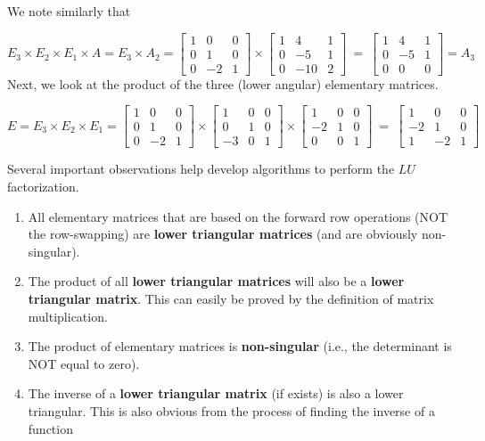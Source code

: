 \documentclass[
]{book}
\begin{document}
We note similarly that

\[
E_3\times E_2\times E_1\times A = E_3\times A_2 =\left[\begin{array}{cccc} 
1 & 0 & 0   \\ 
0 & 1 & 0  \\ 
0 & -2 & 1  
\end{array}
\right]
\times
\left[\begin{array}{cccc} 
1 & 4 & 1   \\ 
0 & -5 & 1  \\ 
0 & -10 & 2  
\end{array}
\right]
~=~
\left[\begin{array}{cccc} 
1 & 4 & 1   \\ 
0 & -5 & 1  \\ 
0 & 0 & 0  
\end{array}
\right] = A_3
\]
Next, we look at the product of the three (lower angular) elementary matrices.

\[
E = E_3\times E_2 \times E_1 =  
\left[\begin{array}{ccccc} 
1 & 0 & 0   \\ 
0 & 1 & 0  \\ 
0 & -2 & 1  
\end{array}
\right]
\times
\left[\begin{array}{ccc} 
1 & 0 & 0   \\ 
0 & 1 & 0  \\ 
-3 & 0 & 1  
\end{array}
\right]
\times
\left[\begin{array}{ccc} 
1 & 0 & 0   \\ 
-2 & 1 & 0  \\ 
0 & 0 & 1  
\end{array}
\right]
~=~
\left[\begin{array}{ccc} 
1 & 0 & 0   \\ 
-2 & 1 & 0  \\ 
1 & -2 & 1  
\end{array}
\right]
\]

Several important observations help develop algorithms to perform the \(LU\) factorization.

\begin{enumerate}
\def\labelenumi{\arabic{enumi}.}
\item
  All elementary matrices that are based on the forward row operations (NOT the row-swapping) are \textbf{lower triangular matrices} (and are obviously non-singular).
\item
  The product of all \textbf{lower triangular matrices} will also be a \textbf{lower triangular matrix}. This can easily be proved by the definition of matrix multiplication.
\item
  The product of elementary matrices is \textbf{non-singular} (i.e., the determinant is NOT equal to zero).
\item
  The inverse of a \textbf{lower triangular matrix} (if exists) is also a lower triangular. This is also obvious from the process of finding the inverse of a function
\end{enumerate}
\end{document}
